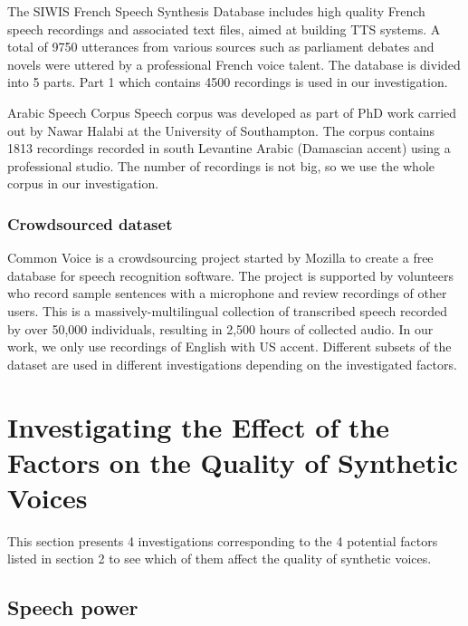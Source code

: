 \documentclass[12pt]{article}
\begin{document}
The SIWIS French Speech Synthesis Database includes high quality French speech recordings and associated text files, aimed at building TTS systems. A total of 9750 utterances from various sources such as parliament debates and novels were uttered by a professional French voice talent. The database is divided into 5 parts. Part 1 which contains 4500 recordings is used in our investigation.

Arabic Speech Corpus Speech corpus was developed as part of PhD work carried out by Nawar Halabi at the University of Southampton. The corpus contains 1813 recordings recorded in south Levantine Arabic (Damascian accent) using a professional studio. The number of recordings is not big, so we use the whole corpus in our investigation.

\subsubsection{Crowdsourced dataset}

Common Voice is a crowdsourcing project started by Mozilla to create a free database for speech recognition software. The project is supported by volunteers who record sample sentences with a microphone and review recordings of other users. This is a massively-multilingual collection of transcribed speech recorded by over 50,000 individuals, resulting in 2,500 hours of collected audio. In our work, we only use recordings of English with US accent. Different subsets of the dataset are used in different investigations depending on the investigated factors.



\clearpage
\section{Investigating the Effect of the Factors on the Quality of Synthetic Voices}\label{sec_investigations}
This section presents 4 investigations corresponding to the 4 potential factors listed in section 2 to see which of them affect the quality of synthetic voices.

\subsection{Speech power}
\end{document}
